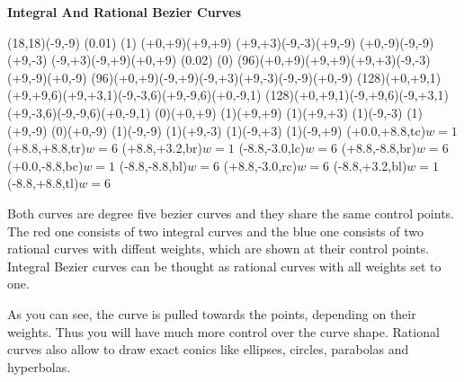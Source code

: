 


\begin{center}
{\Huge \bf{Integral And Rational Bezier Curves}}
\bigskip

\begin{lapdf}(18,18)(-9,-9)
 \Setwidth(0.01)
 \Dash(1)
 \Polygon(+0,+9)(+9,+9)
  (+9,+3)(-9,-3)(+9,-9)
  (+0,-9)(-9,-9)(+9,-3)
  (-9,+3)(-9,+9)(+0,+9) \Stroke
 \Setwidth(0.02)
 \Dash(0)
 \Red
 \Curve(96)(+0,+9)(+9,+9)(+9,+3)(-9,-3)(+9,-9)(+0,-9)
 \Curve(96)(+0,+9)(-9,+9)(-9,+3)(+9,-3)(-9,-9)(+0,-9) \Stroke
 \Blue
 \Rcurve(128)(+0,+9,1)(+9,+9,6)(+9,+3,1)(-9,-3,6)(+9,-9,6)(+0,-9,1)
 \Rcurve(128)(+0,+9,1)(-9,+9,6)(-9,+3,1)(+9,-3,6)(-9,-9,6)(+0,-9,1) \Stroke
 \Black
 \Point(0)(+0,+9)
 \Point(1)(+9,+9)
 \Point(1)(+9,+3)
 \Point(1)(-9,-3)
 \Point(1)(+9,-9)
 \Point(0)(+0,-9)
 \Point(1)(-9,-9)
 \Point(1)(+9,-3)
 \Point(1)(-9,+3)
 \Point(1)(-9,+9)
 \Text(+0.0,+8.8,tc){$w=1$}
 \Text(+8.8,+8.8,tr){$w=6$}
 \Text(+8.8,+3.2,br){$w=1$}
 \Text(-8.8,-3.0,lc){$w=6$}
 \Text(+8.8,-8.8,br){$w=6$}
 \Text(+0.0,-8.8,bc){$w=1$}
 \Text(-8.8,-8.8,bl){$w=6$}
 \Text(+8.8,-3.0,rc){$w=6$}
 \Text(-8.8,+3.2,bl){$w=1$}
 \Text(-8.8,+8.8,tl){$w=6$}
\end{lapdf}
\end{center}

Both curves are degree five bezier curves and they share the same
control points. The red one consists of two integral curves and the
blue one consists of two rational curves with diffent weights, which
are shown at their control points. Integral Bezier curves can be thought
as rational curves with all weights set to one.

As you can see, the curve is pulled towards the points, depending on
their weights. Thus you will have much more control over the curve
shape. Rational curves also allow to draw exact conics like ellipses,
circles, parabolas and hyperbolas.

